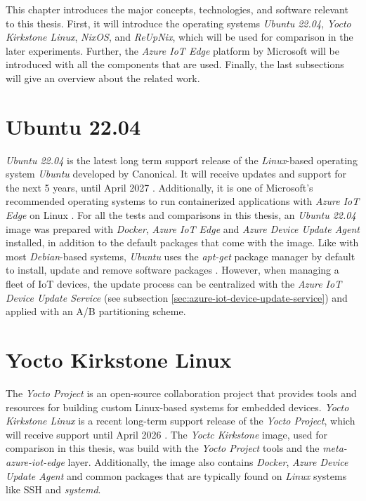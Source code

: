 This chapter introduces the major concepts, technologies,
and software relevant to this thesis. First, it will introduce the operating
systems \textit{Ubuntu 22.04}, \textit{Yocto Kirkstone Linux}, \textit{NixOS},
and \textit{ReUpNix}, which will be used for comparison in the later experiments.
Further, the \textit{Azure IoT Edge} platform by Microsoft will be introduced
with all the components that are used.
Finally, the last subsections will give an overview about the related work.

\section{Ubuntu 22.04}
\textit{Ubuntu 22.04} is the latest long term support release of the
\textit{Linux}-based operating system \textit{Ubuntu} developed by Canonical.
It will receive updates and support for the next 5 years, until April
2027 \cite{ubuntu-releasenote}. Additionally, it is one of Microsoft's
recommended operating systems to run containerized applications with
\textit{Azure IoT Edge} on Linux \cite{msdoc-supportetplatforms}. For all the
tests and comparisons in this thesis, an \textit{Ubuntu 22.04} image was prepared
with \textit{Docker}, \textit{Azure IoT Edge} and \textit{Azure Device Update Agent}
installed, in addition to the default packages that come with the image. Like
with most \textit{Debian}-based systems, \textit{Ubuntu} uses the \textit{apt-get}
package manager by default to install, update and remove software packages \cite{book:344012}.
However, when managing a fleet of \ac{IoT} devices, the update process can be
centralized with the \textit{Azure IoT Device Update Service} (see subsection
\ref{sec:azure-iot-device-update-service}) and applied with an A/B partitioning scheme.

\section{Yocto Kirkstone Linux}
The \textit{Yocto Project} is an open-source collaboration project that provides tools
and resources for building custom Linux-based systems for embedded devices.
\textit{Yocto Kirkstone Linux} is a recent long-term support release of the
\textit{Yocto Project}, which will receive support until April 2026 \cite{yocto-releases}.
The \textit{Yoctc Kirkstone} image, used for comparison in this thesis, was build
with the \textit{Yocto Project} tools and the \textit{meta-azure-iot-edge} layer.
Additionally, the image also contains \textit{Docker}, \textit{Azure Device Update Agent}
and common packages that are typically found on \textit{Linux} systems like \ac{SSH}
and \textit{systemd}.



